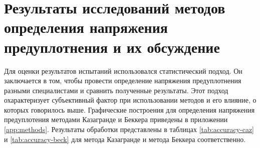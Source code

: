 \chapter{Результаты исследований методов определения напряжения предуплотнения и их обсуждение}


Для оценки результатов испытаний использовался статистический подход.
Он заключается в том, чтобы провести определение напряжения предуплотнения разными специалистами и сравнить полученные результаты.
Этот подход охарактеризует субъективный фактор при использовании методов и его влияние, о которых говорилось выше.
Графические построения для определения напряжения предуплотения методами Казагранде и Беккера приведены в приложении \ref{app:methods}.
Результаты обработки представлены в таблицах \ref{tab:accuracy-caz} и \ref{tab:accuracy-beck} для метода Казагранде и метода Беккера соответственно.


